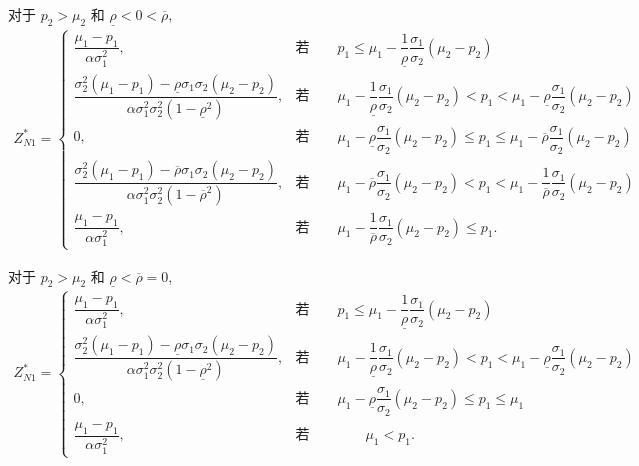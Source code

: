 \documentclass[10.0pt]{article}
\begin{document}
对于 $ p_2 > \mu_2 $ 和 $ \underline{\rho} < 0 < \overline{\rho} $,
{\footnotesize \begin{eqnarray}
Z_{N 1}^* = \left\{ \begin{matrix}
\dfrac{\mu_1 - p_1}{\alpha \sigma_1^2}, & \text{若} \qquad p_1 \leqslant \mu_1 - \dfrac1{\underline{\rho}} \dfrac{\sigma_1}{\sigma_2} (\mu_2 - p_2) \\
\dfrac{\sigma_2^2 (\mu_1 - p_1) - \underline{\rho} \sigma_1 \sigma_2 (\mu_2 - p_2)}{\alpha \sigma_1^2 \sigma_2^2 (1 - \underline{\rho}^2)}, & \text{若} \qquad \mu_1 - \dfrac1{\underline{\rho}} \dfrac{\sigma_1}{\sigma_2} (\mu_2 - p_2) < p_1 < \mu_1 - \underline{\rho} \dfrac{\sigma_1}{\sigma_2} (\mu_2 - p_2) \\
0, & \text{若} \qquad \mu_1 - \underline{\rho} \dfrac{\sigma_1}{\sigma_2} (\mu_2 - p_2) \leqslant p_1 \leqslant \mu_1 - \overline{\rho} \dfrac{\sigma_1}{\sigma_2} (\mu_2 - p_2) \\
\dfrac{\sigma_2^2 (\mu_1 - p_1) - \overline{\rho} \sigma_1 \sigma_2 (\mu_2 - p_2)}{\alpha \sigma_1^2 \sigma_2^2 (1 - \overline{\rho}^2)}, & \text{若} \qquad \mu_1 - \overline{\rho} \dfrac{\sigma_1}{\sigma_2} (\mu_2 - p_2) < p_1 < \mu_1 - \dfrac1{\overline{\rho}} \dfrac{\sigma_1}{\sigma_2} (\mu_2 - p_2) \\
\dfrac{\mu_1 - p_1}{\alpha \sigma_1^2}, & \text{若} \qquad \mu_1 - \dfrac1{\overline{\rho}} \dfrac{\sigma_1}{\sigma_2} (\mu_2 - p_2) \leqslant p_1.
\end{matrix} \right.
\end{eqnarray}}

对于 $ p_2 > \mu_2 $ 和 $ \underline{\rho} < \overline{\rho} = 0 $,
{\footnotesize \begin{eqnarray}
Z_{N 1}^* = \left\{ \begin{matrix}
\dfrac{\mu_1 - p_1}{\alpha \sigma_1^2}, & \text{若} \qquad p_1 \leqslant \mu_1 - \dfrac1{\underline{\rho}} \dfrac{\sigma_1}{\sigma_2} (\mu_2 - p_2) \\
\dfrac{\sigma_2^2 (\mu_1 - p_1) - \underline{\rho} \sigma_1 \sigma_2 (\mu_2 - p_2)}{\alpha \sigma_1^2 \sigma_2^2 (1 - \underline{\rho}^2)}, & \text{若} \qquad \mu_1 - \dfrac1{\underline{\rho}} \dfrac{\sigma_1}{\sigma_2} (\mu_2 - p_2) < p_1 < \mu_1 - \underline{\rho} \dfrac{\sigma_1}{\sigma_2} (\mu_2 - p_2) \\
0, & \text{若} \qquad \mu_1 - \underline{\rho} \dfrac{\sigma_1}{\sigma_2} (\mu_2 - p_2) \leqslant p_1 \leqslant \mu_1 \\
\dfrac{\mu_1 - p_1}{\alpha \sigma_1^2}, & \text{若} \qquad \qquad \mu_1 < p_1.
\end{matrix} \right.
\end{eqnarray}}
\end{document}
